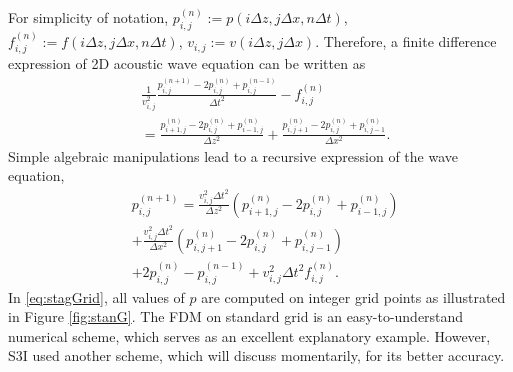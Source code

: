 \documentclass[11pt,titlepage]{article}
\theoremstyle{plain}
\theoremstyle{definition}
\theoremstyle{remark}
\numberwithin{equation}{section}
\begin{document}
For simplicity of notation, $p_{i,j}^{(n)}:=  p(i\Delta z, j\Delta x, n\Delta t)$, $f_{i,j}^{(n)} := f(i\Delta z, j\Delta x, n\Delta t)$, $v_{i,j} := v(i\Delta z, j\Delta x)$.
Therefore, a finite difference expression of 2D acoustic wave equation can be written as 
  \begin{equation}
    \begin{aligned}
    &\frac{1}{v_{i,j}^2}\frac{p_{i,j}^{(n+1)} - 2p_{i,j}^{(n)} + p_{i,j}^{(n-1)}}{\Delta t^2} - f_{i,j}^{(n)} \\
    &= \frac{p_{i+1,j}^{(n)} - 2p_{i,j}^{(n)} + p_{i-1,j}^{(n)}}{\Delta z^2} + \frac{p_{i,j+1}^{(n)} - 2p_{i,j}^{(n)} + p_{i,j-1}^{(n)}}{\Delta x^2}.
    \end{aligned}
  \end{equation}
Simple algebraic manipulations lead to a recursive expression of the wave equation,
  \begin{equation}
  \label{eq:stagGrid}
    \begin{aligned}
    &p_{i,j}^{(n+1)} = \frac{v_{i,j}^2\Delta t^2}{\Delta z^2}\left(p_{i+1,j}^{(n)} - 2p_{i,j}^{(n)} + p_{i-1,j}^{(n)}\right)\\
    &+ \frac{v_{i,j}^2\Delta t^2}{\Delta x^2}\left(p_{i,j+1}^{(n)} - 2p_{i,j}^{(n)} + p_{i,j-1}^{(n)}\right)\\
    &+ 2p_{i,j}^{(n)}-p_{i,j}^{(n-1)} + v_{i,j}^2\Delta t^2 f_{i,j}^{(n)}.
    \end{aligned}
  \end{equation}
  In \eqref{eq:stagGrid}, all values of $p$ are computed on integer grid points as illustrated in Figure \ref{fig:stanG}. The FDM on standard grid is an easy-to-understand numerical scheme, which serves as an excellent explanatory example. However, S3I used another scheme, which will discuss momentarily, for its better accuracy.  
  
\end{document}
